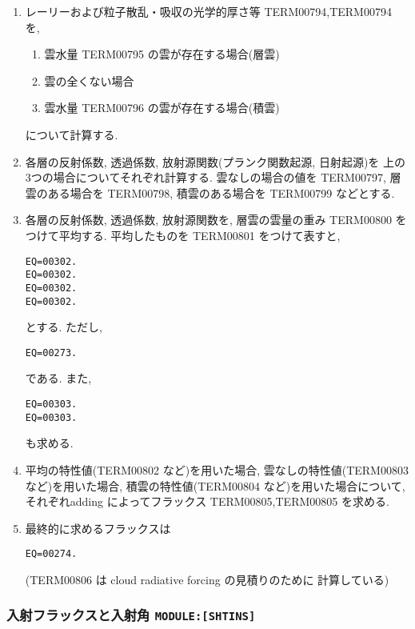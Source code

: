 \begin{enumerate}
\item レーリーおよび粒子散乱・吸収の光学的厚さ等
      TERM00794,TERM00794 を,
      \begin{enumerate}
      \item 雲水量 TERM00795 の雲が存在する場合(層雲)
      \item 雲の全くない場合
      \item 雲水量 TERM00796 の雲が存在する場合(積雲)
      \end{enumerate}
      について計算する.

\item 各層の反射係数, 透過係数, 
      放射源関数(プランク関数起源, 日射起源)を
      上の3つの場合についてそれぞれ計算する.
      雲なしの場合の値を
      TERM00797, 層雲のある場合を TERM00798, 積雲のある場合を
      TERM00799 などとする.

\item 各層の反射係数, 透過係数, 
      放射源関数を, 層雲の雲量の重み TERM00800 をつけて平均する.
      平均したものを TERM00801 をつけて表すと,
      \begin{verbatim}
EQ=00302.
EQ=00302.
EQ=00302.
EQ=00302.
\end{verbatim}
      とする. ただし,
      \begin{verbatim}
EQ=00273.
\end{verbatim}
      である. 
      また,
      \begin{verbatim}
EQ=00303.
EQ=00303.
\end{verbatim}
      も求める.

\item 平均の特性値(TERM00802 など)を用いた場合,
      雲なしの特性値(TERM00803 など)を用いた場合,
      積雲の特性値(TERM00804 など)を用いた場合について,
      それぞれadding によってフラックス
      TERM00805,TERM00805 を求める.
      
\item 最終的に求めるフラックスは
      \begin{verbatim}
EQ=00274.
\end{verbatim}
      (TERM00806 は cloud radiative forcing の見積りのために
       計算している)

\end{enumerate}

\subsubsection{入射フラックスと入射角 \texttt{MODULE:[SHTINS]}}

